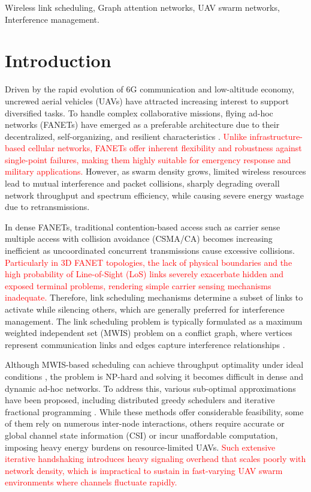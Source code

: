 \documentclass[journal]{IEEEtran}
\begin{document}
	\begin{IEEEkeywords}
		Wireless link scheduling, Graph attention networks, UAV swarm networks, Interference management.
	\end{IEEEkeywords}
	
	\section{Introduction}
	Driven by the rapid evolution of 6G communication and low-altitude economy, uncrewed aerial vehicles (UAVs) have attracted increasing interest to support diversified tasks. To handle complex collaborative missions, flying ad-hoc networks (FANETs) have emerged as a preferable architecture due to their decentralized, self-organizing, and resilient characteristics \cite{uav, ning1, xie}. \textcolor{red}{Unlike infrastructure-based cellular networks, FANETs offer inherent flexibility and robustness against single-point failures, making them highly suitable for emergency response and military applications.} However, as swarm density grows, limited wireless resources lead to mutual interference and packet collisions, sharply degrading overall network throughput and spectrum efficiency, while causing severe energy wastage due to retransmissions.
	
	In dense FANETs, traditional contention-based access such as carrier sense multiple access with collision avoidance (CSMA/CA) \cite{csma} becomes increasing inefficient as uncoordinated concurrent transmissions cause excessive collisions. \textcolor{red}{Particularly in 3D FANET topologies, the lack of physical boundaries and the high probability of Line-of-Sight (LoS) links severely exacerbate hidden and exposed terminal problems, rendering simple carrier sensing mechanisms inadequate.} Therefore, link scheduling mechanisms determine a subset of links to activate while silencing others, which are generally preferred for interference management. The link scheduling problem is typically formulated as a maximum weighted independent set (MWIS) problem on a conflict graph, where vertices represent communication links and edges capture interference relationships \cite{qcsma, zhaoSparsification}. 
	
	Although MWIS-based scheduling can achieve throughput optimality under ideal conditions \cite{TassiulasEphremides1992}, the problem is NP-hard and solving it becomes difficult in dense and dynamic ad-hoc networks. To address this, various sub-optimal approximations have been proposed, including distributed greedy schedulers \cite{LGS} and iterative fractional programming \cite{fplinq}. While these methods offer considerable feasibility, some of them rely on numerous inter-node interactions, others require accurate or global channel state information (CSI) or incur unaffordable computation, imposing heavy energy burdens on resource-limited UAVs. \textcolor{red}{Such extensive iterative handshaking introduces heavy signaling overhead that scales poorly with network density, which is impractical to sustain in fast-varying UAV swarm environments where channels fluctuate rapidly.}
	
\end{document}
